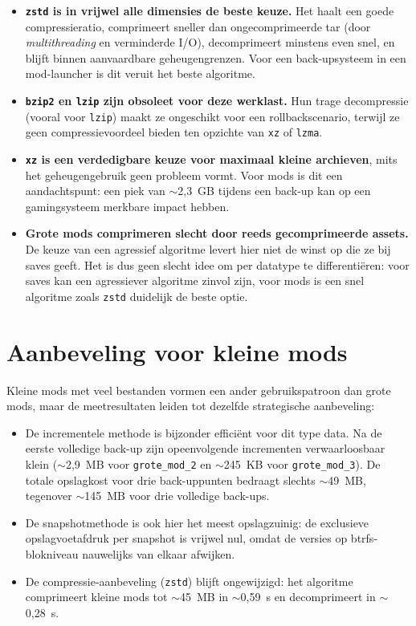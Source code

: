 \begin{itemize}
    \item \textbf{\texttt{zstd} is in vrijwel alle dimensies de beste keuze.} Het haalt een goede compressieratio, comprimeert sneller dan ongecomprimeerde tar (door \textit{multithreading} en verminderde I/O), decomprimeert minstens even snel, en blijft binnen aanvaardbare geheugengrenzen. Voor een back-upsysteem in een mod-launcher is dit veruit het beste algoritme.
    \item \textbf{\texttt{bzip2} en \texttt{lzip} zijn obsoleet voor deze werklast.} Hun trage decompressie (vooral voor \texttt{lzip}) maakt ze ongeschikt voor een rollbackscenario, terwijl ze geen compressievoordeel bieden ten opzichte van \texttt{xz} of \texttt{lzma}.
    \item \textbf{\texttt{xz} is een verdedigbare keuze voor maximaal kleine archieven}, mits het geheugengebruik geen probleem vormt. Voor mods is dit een aandachtspunt: een piek van $\sim$2{,}3~GB tijdens een back-up kan op een gamingsysteem merkbare impact hebben.
    \item \textbf{Grote mods comprimeren slecht door reeds gecomprimeerde assets.} De keuze van een agressief algoritme levert hier niet de winst op die ze bij saves geeft. Het is dus geen slecht idee om per datatype te differentiëren: voor saves kan een agressiever algoritme zinvol zijn, voor mods is een snel algoritme zoals \texttt{zstd} duidelijk de beste optie.
\end{itemize}


\section{Aanbeveling voor kleine mods}
\label{sec:kleine-mods}

Kleine mods met veel bestanden vormen een ander gebruikspatroon dan grote mods, maar de meetresultaten leiden tot dezelfde strategische aanbeveling:

\begin{itemize}
    \item De incrementele methode is bijzonder efficiënt voor dit type data. Na de eerste volledige back-up zijn opeenvolgende incrementen verwaarloosbaar klein ($\sim$2{,}9~MB voor \texttt{grote\_mod\_2} en $\sim$245~KB voor \texttt{grote\_mod\_3}). De totale opslagkost voor drie back-uppunten bedraagt slechts $\sim$49~MB, tegenover $\sim$145~MB voor drie volledige back-ups.
    \item De snapshotmethode is ook hier het meest opslagzuinig: de exclusieve opslagvoetafdruk per snapshot is vrijwel nul, omdat de versies op btrfs-blokniveau nauwelijks van elkaar afwijken.
    \item De compressie-aanbeveling (\texttt{zstd}) blijft ongewijzigd: het algoritme comprimeert kleine mods tot $\sim$45~MB in $\sim$0{,}59~s en decomprimeert in $\sim$0{,}28~s.
\end{itemize}

